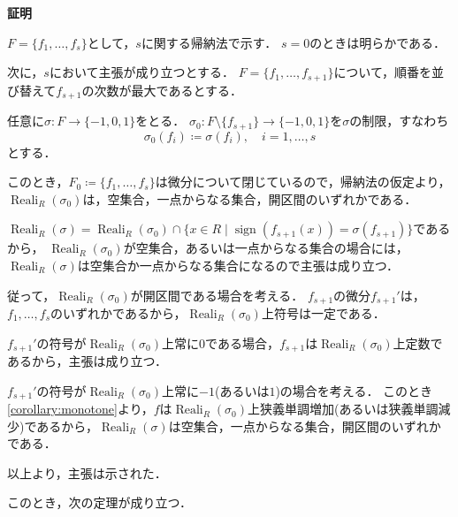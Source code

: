 \documentclass[uplatex, dvipdfmx]{jsarticle}
\makeatletter
\numberwithin{equation}{section}
\renewenvironment{proof}[1][\proofname]{\par
  \pushQED{\qed}%
  \normalfont \topsep6\p@\@plus6\p@\relax
  \trivlist
  \item\relax
  {\bfseries
  #1\@addpunct{.}}\hspace\labelsep\ignorespaces
}{
  \popQED\endtrivlist\@endpefalse
}
\newcommand{\map}[3]{{#1}\colon{#2}\rightarrow{#3}}
\DeclareMathOperator{\Reali}{Reali}
\DeclareMathOperator{\sign}{sign}
\theoremstyle{definition}
\renewcommand{\proofname}{\textbf{証明}}
\makeatother
\begin{document}
\begin{proof}
     $F = \{f_1, \dots, f_s\}$として，$s$に関する帰納法で示す．
     $s = 0$のときは明らかである．
     
     次に，$s$において主張が成り立つとする．
     $F = \{f_1, \dots, f_{s+1}\}$について，順番を並び替えて$f_{s+1}$の次数が最大であるとする．

     任意に$\map{\sigma}{F}{\{-1,0,1\}}$をとる．
     $\map{\sigma_0}{F \setminus \{f_{s+1}\}}{\{-1,0,1\}}$を$\sigma$の制限，すなわち
     \begin{equation}
          \sigma_0(f_i) \coloneqq \sigma(f_i), \quad i=1, \dots, s
     \end{equation}
     とする．

     このとき，$F_0 \coloneqq \{f_1, \dots, f_{s}\}$は微分について閉じているので，帰納法の仮定より，
     $\Reali_R(\sigma_0)$は，空集合，一点からなる集合，開区間のいずれかである．

     $\Reali_R(\sigma) = \Reali_R({\sigma_0}) \cap \{x \in R \mid \sign(f_{s+1}(x)) = \sigma(f_{s+1})\}$であるから，
     $\Reali_R({\sigma_0})$が空集合，あるいは一点からなる集合の場合には，$\Reali_R(\sigma)$は空集合か一点からなる集合になるので主張は成り立つ．

     従って，$\Reali_R({\sigma_0})$が開区間である場合を考える．
     $f_{s+1}$の微分$f_{s+1}'$は，$f_1, \dots, f_s$のいずれかであるから，$\Reali_R({\sigma_0})$上符号は一定である．

     $f_{s+1}'$の符号が$\Reali_R({\sigma_0})$上常に$0$である場合，$f_{s+1}$は$\Reali_R({\sigma_0})$上定数であるから，主張は成り立つ．

     $f_{s+1}'$の符号が$\Reali_R({\sigma_0})$上常に$-1$(あるいは$1$)の場合を考える．
     このとき\cref{corollary:monotone}より，$f$は$\Reali_R({\sigma_0})$上狭義単調増加(あるいは狭義単調減少)であるから，$\Reali_R(\sigma)$は空集合，一点からなる集合，開区間のいずれかである．

     以上より，主張は示された．
\end{proof}

このとき，次の定理が成り立つ．
\end{document}
